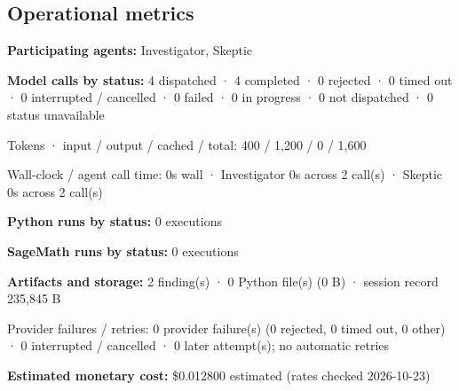 \documentclass[11pt]{article}
\begin{document}
\subsection{Operational metrics}
\textbf{Participating agents:} Investigator, Skeptic\par
\textbf{Model calls by status:} 4 dispatched · 4 completed · 0 rejected · 0 timed out · 0 interrupted / cancelled · 0 failed · 0 in progress · 0 not dispatched · 0 status unavailable\par
Tokens · input / output / cached / total: 400 / 1,200 / 0 / 1,600\par
Wall-clock / agent call time: 0s wall · Investigator 0s across 2 call(s) · Skeptic 0s across 2 call(s)\par
\textbf{Python runs by status:} 0 executions\par
\textbf{SageMath runs by status:} 0 executions\par
\textbf{Artifacts and storage:} 2 finding(s) · 0 Python file(s) (0 B) · session record 235,845 B\par
Provider failures / retries: 0 provider failure(s) (0 rejected, 0 timed out, 0 other) · 0 interrupted / cancelled · 0 later attempt(s); no automatic retries\par
\textbf{Estimated monetary cost:} \$0.012800 estimated (rates checked 2026-10-23)\par
\end{document}

